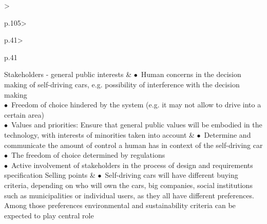 \begin{table}[t]
\begin{small}
\begin{supertabular}{%
		>{\raggedright}p{.105\textwidth}>{\raggedright}p{.41\textwidth}>{\raggedright}p{.41\textwidth}}
			\tabularnewline \hline %
			\vspace{.1cm}Stakeholders - general public interests & \vspace{.1cm}
				\noindent $\bullet$~Human concerns in the decision making of self-driving cars, e.g. possibility of interference with the decision making\\
				\noindent $\bullet$~Freedom of choice hindered by the system (e.g. it may not allow to drive into a certain area) \\
				\noindent $\bullet$~Values and priorities: Ensure that general public values will be embodied in the technology, with interests of minorities taken into account\vspace{.2cm}%
			& \vspace{.1cm}
				\noindent $\bullet$~Determine and communicate the amount of control a human has in context of the self-driving car\\
				\noindent $\bullet$~The freedom of choice determined by regulations \\
				\noindent $\bullet$~Active involvement of stakeholders in the process of design and requirements specification
 			 \tabularnewline \hline %
  			\vspace{.1cm}Selling points & \vspace{.1cm}
				\noindent $\bullet$~Self-driving cars will have different buying criteria, depending on who will own the cars, big companies, social institutions such as municipalities or individual users, as they all have different preferences. Among those preferences environmental and sustainability criteria can be expected to play central role\\

\end{supertabular}
\end{small}
\end{table}
